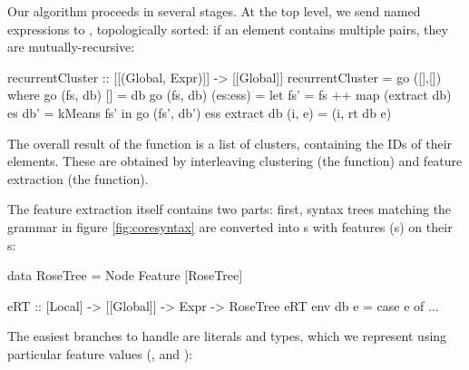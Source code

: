 \iffalse TODO: the code should go in the implementation section rather than here \fi
\iffalse TODO: give a more abstract presentation, using mathematical notation \fi
\iffalse TODO: maybe focus on the ``interesting cases'', and defer the nitty-gritty of extending the environment, etc. to the implementation section? \fi
\iffalse TODO: Define rose trees \fi
\iffalse TODO: Show an example from earlier, e.g. factorial \fi
\iffalse TODO: Split into three parts: expressions to rose trees of features; rose trees to matrices to vectors; k-means clustering \fi
\iffalse TODO: highlight the recurrent nature of the algorithm \fi
\iffalse TODO: I would probably just restructure:
 - start with the syntax, get to show how, for every line of figure 1, extraction works
 - then transformation to feature vectors
 - then k-means
obviously, they are mutually recursive...
\fi

Our algorithm proceeds in several stages. At the top level, we send named expressions to , topologically sorted: if an element contains multiple  pairs, they are mutually-recursive:

\begin{haskell}
recurrentCluster :: [[(Global, Expr)]] -> [[Global]]
recurrentCluster = go ([],[])
  where go (fs, db) []       = db
        go (fs, db) (es:ess) = let fs' = fs ++ map (extract db) es
                                   db' = kMeans fs'
                                in go (fs', db') ess
        extract db (i, e) = (i, rt db e)
\end{haskell}

The overall result of the  function is a list of clusters, containing the IDs of their elements. These are obtained by interleaving clustering (the  function) and feature extraction (the  function).

The feature extraction itself contains two parts: first, syntax trees matching the grammar in figure \ref{fig:coresyntax} are converted into s with features (s) on their s:

\begin{haskell}
data RoseTree = Node Feature [RoseTree]

eRT :: [Local] -> [[Global]] -> Expr -> RoseTree
eRT env db e = case e of
  ...
\end{haskell}

The easiest branches to handle are literals and types, which we represent using particular feature values (,  and ):

